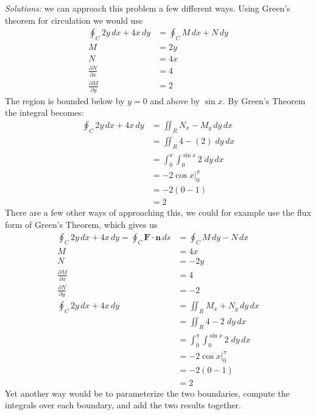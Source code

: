     \ifnum {} {\color{DarkBlue}  \textit{Solutions:} 
    we can approach this problem a few different ways. Using Green's theorem for circulation we would use 
    \begin{align}
       \oint_C 2 y \, dx + 4x \,dy  
       & = \oint_C M\, dx + N \,dy  \\
       M&= 2y \\
       N&= 4x \\
       \frac{\partial N}{\partial x} &= 4 \\
       \frac{\partial M}{\partial y} &= 2
    \end{align}   
    The region is bounded below by $y=0$ and above by $\sin x$. By Green's Theorem the integral becomes:
    \begin{align}
       \oint_C 2 y \, dx + 4x \,dy 
       & = \iint_R N_x - M_y \, dy\,dx \\
       &= \iint_R  4 - (2) \;dy\,dx \\
       &=  \int_0^{\pi}\int_0^{\sin x} 2\;dy\,dx \\
       &= -2\cos x \Big\vert_0^\pi \\
       &= -2(0-1) \\
       &= 2  
    \end{align}
    There are a few other ways of approaching this, we could for example use the flux form of Green's Theorem, which gives us
    \begin{align}
       \oint_C 2 y \, dx + 4x \,dy  = \oint_C \mathbf F \cdot \mathbf n \, ds 
       & = \oint_C M\, dy - N \,dx  \\
       M&= 4x \\
       N&= -2y \\
       \frac{\partial M}{\partial x} &= 4 \\
       \frac{\partial N}{\partial y} &= -2 \\
       \oint_C 2 y \, dx + 4x \,dy 
       & = \iint_R M_x + N_y \, dy\,dx \\
       &= \iint_R  4 - 2 \;dy\,dx \\
       &=  \int_0^{\pi}\int_0^{\sin x} 2\;dy\,dx \\
       &= -2\cos x \Big\vert_0^\pi \\
       &= -2(0-1) \\
       &= 2         
    \end{align}    
    Yet another way would be to parameterize the two boundaries, compute the integrals over each boundary, and add the two results together. 
    } 
   \else
      
